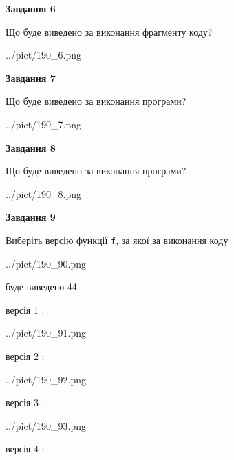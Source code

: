 \documentclass[12pt, ukrainian]{article}
\def\code#1{\Verb!#1!}
\begin{document}
{\begin {large}
{\begin {center}\textbf{Завдання 6}\end {center}}

Що буде виведено за виконання фрагменту коду?\par
\begin{center}
	{../pict/190_6.png}
\end{center}
\newpage

{\begin {center}\textbf{Завдання 7}\end {center}}

Що буде виведено за виконання програми?\par
\begin{center}
	{../pict/190_7.png}
\end{center}
\newpage

{\begin {center}\textbf{Завдання 8}\end {center}}

Що буде виведено за виконання програми?\par
\begin{center}
	{../pict/190_8.png}
\end{center}
\newpage

{\begin {center}\textbf{Завдання 9}\end {center}}

Виберіть версію функції \code{f}, за якої за виконання коду
\begin{center}
	{../pict/190_90.png}
\end{center}
буде виведено 44

\vspace{5mm}
версія 1 :

\begin{center}
	{../pict/190_91.png}
\end{center}
версія 2 :

\begin{center}
	{../pict/190_92.png}
\end{center}
версія 3 :

\begin{center}
	{../pict/190_93.png}
\end{center}
версія 4 :


\end{large}}
\end{document}
